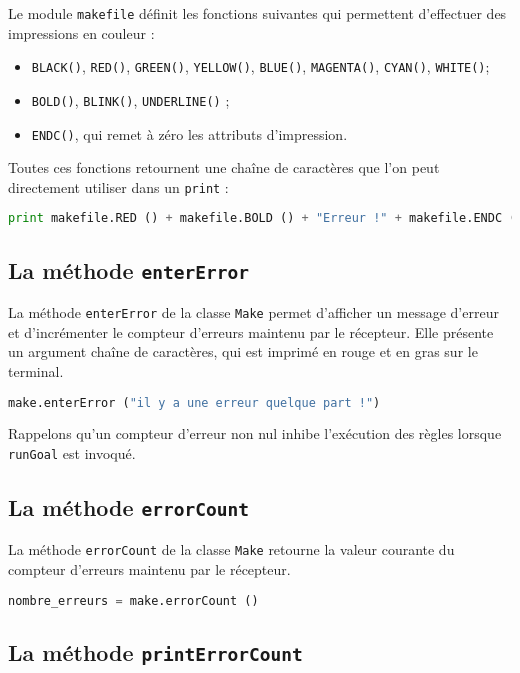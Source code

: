 \documentclass[a4paper,11pt]{extarticle}
\begin{document}
Le module \texttt{makefile} définit les fonctions suivantes qui permettent d'effectuer des impressions en couleur :
\begin{itemize}
  \item \texttt{BLACK()}, \texttt{RED()}, \texttt{GREEN()}, \texttt{YELLOW()}, \texttt{BLUE()}, \texttt{MAGENTA()}, \texttt{CYAN()}, \texttt{WHITE()};
  \item \texttt{BOLD()}, \texttt{BLINK()}, \texttt{UNDERLINE()} ;
  \item \texttt{ENDC()}, qui remet à zéro les attributs d'impression.
\end{itemize}
Toutes ces fonctions retournent une chaîne de caractères que l'on peut directement utiliser dans un \texttt{print} :
\begin{lstlisting}[language=py]
print makefile.RED () + makefile.BOLD () + "Erreur !" + makefile.ENDC ()
\end{lstlisting}


\subsection{La méthode \texttt{enterError}}

La méthode \texttt{enterError} de la classe \texttt{Make} permet d'afficher un message d'erreur et d'incrémenter le compteur d'erreurs maintenu par le récepteur. Elle présente un argument chaîne de caractères, qui est imprimé en rouge et en gras sur le terminal.
\begin{lstlisting}[language=py]
make.enterError ("il y a une erreur quelque part !")
\end{lstlisting}
Rappelons qu'un compteur d'erreur non nul inhibe l'exécution des règles lorsque \texttt{runGoal} est invoqué.


\subsection{La méthode \texttt{errorCount}}

La méthode \texttt{errorCount} de la classe \texttt{Make} retourne la valeur courante du compteur d'erreurs maintenu par le récepteur.
\begin{lstlisting}[language=py]
nombre_erreurs = make.errorCount ()
\end{lstlisting}


\subsection{La méthode \texttt{printErrorCount}}
\end{document}
